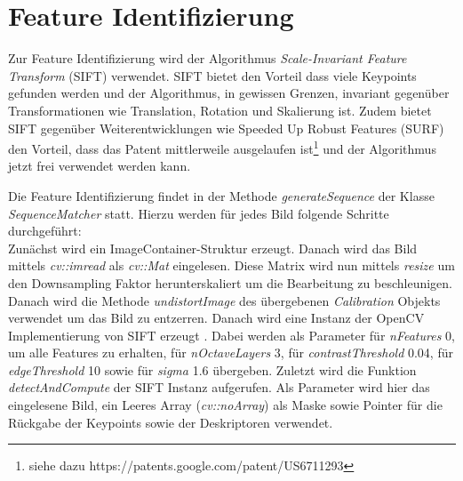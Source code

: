 \section{Feature Identifizierung}\label{sec:feature-identification}
Zur Feature Identifizierung wird der Algorithmus \emph{Scale-Invariant Feature Transform} (SIFT) verwendet.
SIFT bietet den Vorteil dass viele Keypoints gefunden werden und der Algorithmus, in gewissen Grenzen, invariant gegenüber Transformationen wie Translation, Rotation und Skalierung ist.
Zudem bietet SIFT gegenüber Weiterentwicklungen wie Speeded Up Robust Features (SURF) den Vorteil, dass das Patent mittlerweile ausgelaufen ist\footnote{siehe dazu https://patents.google.com/patent/US6711293} und der Algorithmus jetzt frei verwendet werden kann.

Die Feature Identifizierung findet in der Methode \emph{generateSequence} der Klasse \emph{SequenceMatcher} statt.
Hierzu werden für jedes Bild folgende Schritte durchgeführt:\\
Zunächst wird ein ImageContainer-Struktur erzeugt.
Danach wird das Bild mittels \emph{cv::imread}\cite{opencv_doc_imread} als \emph{cv::Mat}\cite{opencv_doc_mat} eingelesen.
Diese Matrix wird nun mittels \emph{resize} um den Downsampling Faktor herunterskaliert um die Bearbeitung zu beschleunigen.
Danach wird die Methode \emph{undistortImage} des übergebenen \emph{Calibration} Objekts verwendet um das Bild zu entzerren.
Danach wird eine Instanz der OpenCV Implementierung von SIFT erzeugt \cite{opencv_doc_sift}.
Dabei werden als Parameter für \emph{nFeatures} 0, um alle Features zu erhalten, für \emph{nOctaveLayers} 3, für \emph{contrastThreshold} 0.04, für \emph{edgeThreshold} 10 sowie für \emph{sigma} 1.6 übergeben.
Zuletzt wird die Funktion \emph{detectAndCompute}\cite{opencv_doc_detect_and_compute} der SIFT Instanz aufgerufen.
Als Parameter wird hier das eingelesene Bild, ein Leeres Array (\emph{cv::noArray}\cite{opencv_doc_no_array}) als Maske sowie Pointer für die Rückgabe der Keypoints sowie der Deskriptoren verwendet.